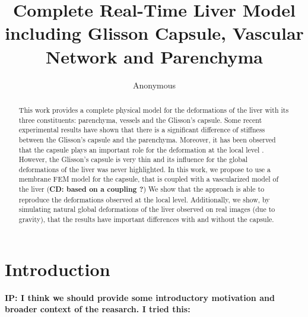 \documentclass{llncs}
\newcommand{\CD}[1]{{\color{green}\textbf{CD: #1}}}
\newcommand{\IP}[1]{{\color{cyan}\textbf{IP: #1}}}
\begin{document}
%
%
\mainmatter              %
%
\title{Complete Real-Time Liver Model including Glisson Capsule, Vascular Network and Parenchyma}
%
%
\author{Anonymous}
%
%
%
\maketitle

\begin{abstract}
This work provides a complete physical model for the deformations of the liver with its three constituents: parenchyma, vessels and the Glisson's capsule.
Some recent experimental results \cite{Ahn2010} have shown that there is a significant difference of stiffness between the Glisson's capsule and the parenchyma. 
Moreover, it has been observed that the capsule plays an important role for the deformation at the local level \cite{Hollenstein2006}.
However, the Glisson's capsule is very thin and its influence for the global deformations of the liver was never highlighted.
In this work, we propose to use a membrane FEM model for the capsule, that is coupled with a vascularized model of the liver (\CD{based on a coupling ?})
We show that the approach is able to reproduce the deformations observed at the local level.
Additionally, we show, by simulating natural global deformations of the liver observed on real images (due to gravity), that the results have important differences with and without the capsule.

\end{abstract}

\section{Introduction} 
\IP{I think we should provide some introductory motivation and broader context of the reasarch. I tried this:}
\end{document}
